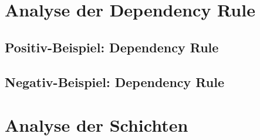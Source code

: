 \section{Analyse der Dependency Rule}

\subsection{Positiv-Beispiel: Dependency Rule}

\subsection{Negativ-Beispiel: Dependency Rule}

\section{Analyse der Schichten}
